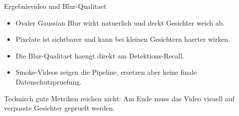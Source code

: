 \begin{frame}{Ergebnisvideo und Blur-Qualitaet}
\begin{itemize}
    \item Ovaler Gaussian Blur wirkt natuerlich und deckt Gesichter weich ab.
    \item Pixelate ist sichtbarer und kann bei kleinen Gesichtern haerter wirken.
    \item Die Blur-Qualitaet haengt direkt am Detektions-Recall.
    \item Smoke-Videos zeigen die Pipeline, ersetzen aber keine finale Datenschutzpruefung.
\end{itemize}
\vspace{0.6em}
\begin{mynote}[Qualitaetscheck]
Technisch gute Metriken reichen nicht: Am Ende muss das Video visuell auf verpasste Gesichter geprueft werden.
\end{mynote}
\end{frame}
